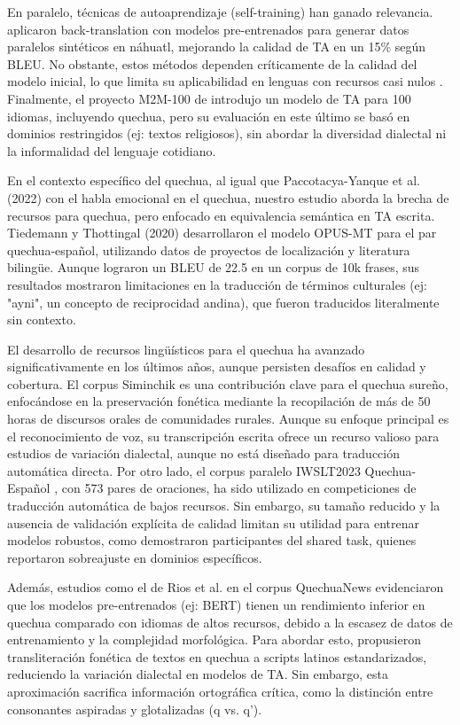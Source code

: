 En paralelo, técnicas de autoaprendizaje (self-training) han ganado relevancia. \cite{shi2021highland} aplicaron back-translation con modelos pre-entrenados para generar datos paralelos sintéticos en náhuatl, mejorando la calidad de TA en un 15\% según BLEU. No obstante, estos métodos dependen críticamente de la calidad del modelo inicial, lo que limita su aplicabilidad en lenguas con recursos casi nulos \cite{agic2019jw300}. Finalmente, el proyecto M2M-100 de \cite{fan2021beyond} introdujo un modelo de TA para 100 idiomas, incluyendo quechua, pero su evaluación en este último se basó en dominios restringidos (ej: textos religiosos), sin abordar la diversidad dialectal ni la informalidad del lenguaje cotidiano.

En el contexto específico del quechua, al igual que Paccotacya-Yanque et al. (2022) con el habla emocional en el quechua, nuestro estudio aborda la brecha de recursos para quechua, pero enfocado en equivalencia semántica en TA escrita. Tiedemann y Thottingal (2020) desarrollaron el modelo OPUS-MT para el par quechua-español, utilizando datos de proyectos de localización y literatura bilingüe. Aunque lograron un BLEU de 22.5 en un corpus de 10k frases, sus resultados mostraron limitaciones en la traducción de términos culturales (ej: "ayni", un concepto de reciprocidad andina), que fueron traducidos literalmente sin contexto.

El desarrollo de recursos lingüísticos para el quechua ha avanzado significativamente en los últimos años, aunque persisten desafíos en calidad y cobertura. El corpus Siminchik \cite{cardenas2018siminchik} es una contribución clave para el quechua sureño, enfocándose en la preservación fonética mediante la recopilación de más de 50 horas de discursos orales de comunidades rurales. Aunque su enfoque principal es el reconocimiento de voz, su transcripción escrita ofrece un recurso valioso para estudios de variación dialectal, aunque no está diseñado para traducción automática directa. Por otro lado, el corpus paralelo IWSLT2023 Quechua-Español \cite{rios2011spell}, con 573 pares de oraciones, ha sido utilizado en competiciones de traducción automática de bajos recursos. Sin embargo, su tamaño reducido y la ausencia de validación explícita de calidad limitan su utilidad para entrenar modelos robustos, como demostraron participantes del shared task, quienes reportaron sobreajuste en dominios específicos.

Además, estudios como el de Rios et al. \cite{rios2015basic} en el corpus QuechuaNews evidenciaron que los modelos pre-entrenados (ej: BERT) tienen un rendimiento inferior en quechua comparado con idiomas de altos recursos, debido a la escasez de datos de entrenamiento y la complejidad morfológica. Para abordar esto, \cite{cardenas2018siminchik} propusieron transliteración fonética de textos en quechua a scripts latinos estandarizados, reduciendo la variación dialectal en modelos de TA. Sin embargo, esta aproximación sacrifica información ortográfica crítica, como la distinción entre consonantes aspiradas y glotalizadas (q vs. q').

